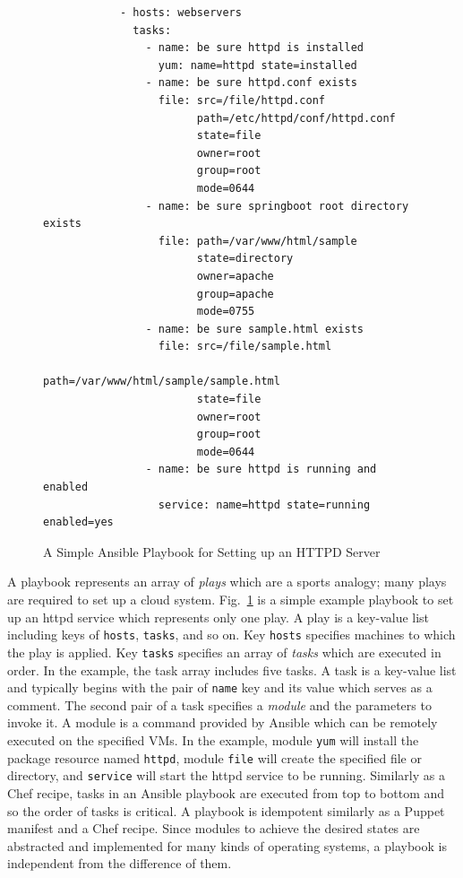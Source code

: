 \documentclass[12pt]{report}
\begin{document}
\begin{figure}
\small
\begin{verbatim}
            - hosts: webservers
              tasks:
                - name: be sure httpd is installed
                  yum: name=httpd state=installed
                - name: be sure httpd.conf exists
                  file: src=/file/httpd.conf
                        path=/etc/httpd/conf/httpd.conf
                        state=file
                        owner=root
                        group=root
                        mode=0644
                - name: be sure springboot root directory exists
                  file: path=/var/www/html/sample
                        state=directory
                        owner=apache
                        group=apache
                        mode=0755
                - name: be sure sample.html exists
                  file: src=/file/sample.html
                        path=/var/www/html/sample/sample.html
                        state=file
                        owner=root
                        group=root
                        mode=0644
                - name: be sure httpd is running and enabled
                  service: name=httpd state=running enabled=yes
\end{verbatim}
\normalsize
\vspace{-0.6cm}
\caption{A Simple Ansible Playbook for Setting up an HTTPD Server}
\label{fig:AnsibleExample}
\end{figure}

A playbook represents an array of {\it plays} which are a sports
analogy; many plays are required to set up a cloud
system. Fig.~\ref{fig:AnsibleExample} is a simple example playbook to
set up an httpd service which represents only one play. A play is a
key-value list including keys of {\tt hosts}, {\tt tasks}, and so
on. Key {\tt hosts} specifies machines to which the play is applied.
Key {\tt tasks} specifies an array of {\it tasks} which are executed
in order.  In the example, the task array includes five tasks. A task
is a key-value list and typically begins with the pair of {\tt name}
key and its value which serves as a comment. The second pair of a task
specifies a {\it module} and the parameters to invoke it.  A module is
a command provided by Ansible which can be remotely executed on the
specified VMs. In the example, module {\tt yum} will install the
package resource named {\tt httpd}, module {\tt file} will create the
specified file or directory, and {\tt service} will start the httpd
service to be running. Similarly as a Chef recipe, tasks in an Ansible
playbook are executed from top to bottom and so the order of tasks is
critical.  A playbook is idempotent similarly as a Puppet manifest and
a Chef recipe. Since modules to achieve the desired states are
abstracted and implemented for many kinds of operating systems, a
playbook is independent from the difference of them.
\end{document}
